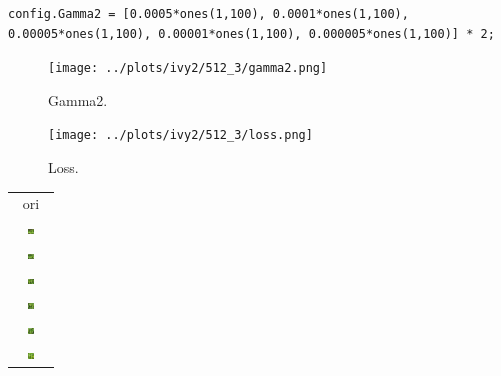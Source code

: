 \documentclass[letter]{article}
\begin{document}
\begin{lstlisting}
config.Gamma2 = [0.0005*ones(1,100), 0.0001*ones(1,100), 0.00005*ones(1,100), 0.00001*ones(1,100), 0.000005*ones(1,100)] * 2;
\end{lstlisting}

\begin{figure}[h!]
	\centering
	\texttt{[image: ../plots/ivy2/512\_3/gamma2.png]}
	\caption{\label{fig:gamma1}Gamma2.}
\end{figure}

\begin{figure}[h!]
	\centering
	\texttt{[image: ../plots/ivy2/512\_3/loss.png]}
	\caption{\label{fig:gamma1}Loss.}
\end{figure}

\newpage

\begin{table}[h!]
	\centering
	\begin{tabular}{c}
		ori\tabularnewline
		\includegraphics[width=0.17\textwidth]{../data/ivy2/512/1} \tabularnewline		\includegraphics[width=0.17\textwidth]{../data/ivy2/512/2} \tabularnewline		\includegraphics[width=0.17\textwidth]{../data/ivy2/512/3} \tabularnewline		\includegraphics[width=0.17\textwidth]{../data/ivy2/512/4} \tabularnewline		\includegraphics[width=0.17\textwidth]{../data/ivy2/512/5} \tabularnewline		\includegraphics[width=0.17\textwidth]{../data/ivy2/512/6} \tabularnewline

\end{tabular}
\end{table}
\end{document}
